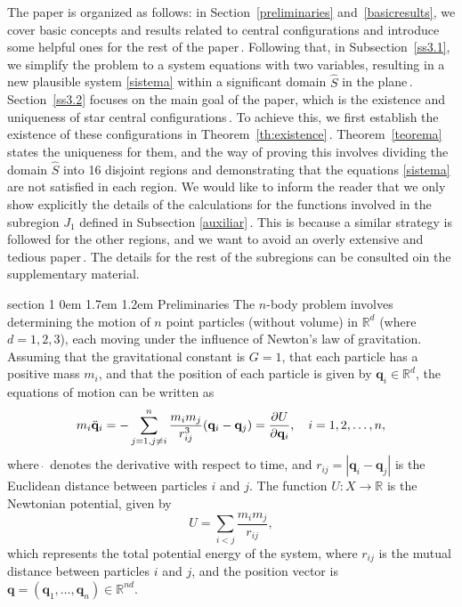\documentclass[final,11pt]{article}
\makeatletter
\renewcommand{\section}{\@startsection%
{section}%
{1}%
{0em}%
{1.7em}%
{1.2em}%
{\normalfont\large\centering\bfseries}}
\numberwithin{equation}{section}
\theoremstyle{definition}
\makeatother
\begin{document}
The paper is organized as follows: in Section~\ref{preliminaries} and~\ref{basicresults}, we cover basic concepts and results related to central configurations and introduce some helpful ones for the rest of the paper\,. Following that, in Subsection~\ref{ss3.1}, we simplify the problem to a system equations with two variables, resulting in a new plausible system \eqref{sistema} within a significant domain $\hat{S}$ in the plane\,. Section~\ref{ss3.2} focuses on the main goal of the paper, which is the existence and uniqueness of star central configurations\,. To achieve this, we first establish the existence of these configurations in Theorem~\ref{th:existence}\,. Theorem~\ref{teorema} states the uniqueness for them, and the way of proving this involves dividing the domain $\hat{S}$ into 16 disjoint regions and demonstrating that the equations \eqref{sistema} are not satisfied in each region.
We would like to inform the reader that we only show explicitly the details of the calculations for the functions involved in the subregion $J_1$ defined in Subsection \ref{auxiliar}\,. This is because a similar strategy is followed for the other regions, and we want to avoid an overly extensive and tedious paper\,. The details for the rest of the subregions can be consulted oin the supplementary material.

\section{Preliminaries}  \label{preliminaries}
The $n$-body problem involves determining the motion of $ n $ point particles (without volume) in $ \mathbb{R}^d $ (where $ d = 1, 2, 3 $), each moving under the influence of Newton's law of gravitation. Assuming that the gravitational constant is $ G = 1 $, that each particle has a positive mass $ m_i $, and that the position of each particle is given by $ \mathbf{q}_i \in \mathbb{R}^d $, the equations of motion can be written as
\begin{equation}
m_i \ddot{\mathbf{q}}_i = -\sum_{j=1, \\ j \neq i}^n \frac{m_i m_j}{r_{ij}^3} (\mathbf{q}_i - \mathbf{q}_j) = \frac{\partial U}{\partial \mathbf{q}_i}, \quad i = 1, 2, \dots, n, \label{ecmov}
\end{equation}
where $ \dot{\ } $ denotes the derivative with respect to time, and $ r_{ij} = |\mathbf{q}_i - \mathbf{q}_j| $ is the Euclidean distance between particles $ i $ and $ j $. The function $ U: X \to \mathbb{R} $ is the Newtonian potential, given by
\begin{equation*}
U = \sum_{i < j} \frac{m_i m_j}{r_{ij}},
\end{equation*}
which represents the total potential energy of the system, where $ r_{ij} $ is the mutual distance between particles $ i $ and $ j $, and the position vector is $ \mathbf{q} = (\mathbf{q}_1, \dots, \mathbf{q}_n) \in \mathbb{R}^{nd} $.
\end{document}
